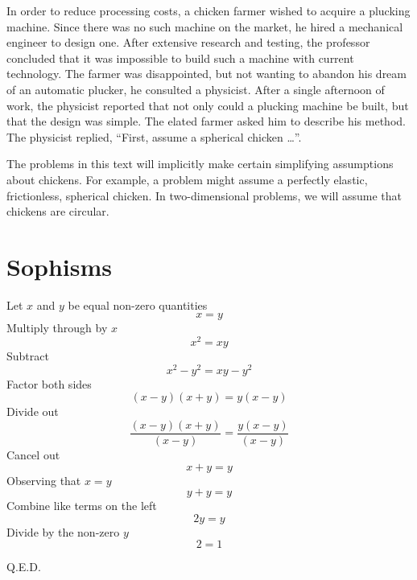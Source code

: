 In order to reduce processing costs, a chicken farmer wished to acquire
a plucking machine.  Since there was no such machine on the market, 
he hired a mechanical engineer to design one.  After extensive
research and testing, the professor concluded that it was impossible to 
build such a machine with current technology.  The farmer was disappointed,
but not wanting to abandon his dream of an automatic plucker, he consulted
a physicist.  After a single afternoon of work, the physicist reported 
that not only could a plucking machine be built, but that the design 
was simple.  The elated farmer asked him to describe his method.
The physicist replied, ``First, assume a spherical chicken \ldots''.

The problems in this text will implicitly make certain simplifying 
assumptions about chickens.  For example, a problem might assume 
a perfectly elastic, frictionless, spherical chicken.  In two-dimensional
problems, we will assume that chickens are circular.



\chapter{Sophisms}
\label{chapter  proofs}
\flushbottom


Let $x$ and $y$ be equal non-zero quantities
\begin{equation*}
x=y
\end{equation*}
Multiply through by $x$
\begin{equation*}
x^2 = x y 
\end{equation*}
 Subtract 
 \begin{equation*}
x^2 - y^2 = x y - y^2 
\end{equation*}
Factor both sides
\begin{equation*}
(x - y)(x + y) = y (x - y) 
\end{equation*}
 Divide out
 \begin{equation*}
\frac{(x - y)(x + y)}{(x - y)} = \frac{y(x - y)}{(x - y)} 
\end{equation*}
 Cancel out 
\begin{equation*}
x + y = y 
\end{equation*}
Observing that  $x=y$
\begin{equation*}
y + y = y 
\end{equation*}
Combine like terms on the left
\begin{equation*}
2 y =y 
\end{equation*}
Divide by the non-zero $y$ 
\begin{equation*}
2=1
\end{equation*}
\begin{flushright}
 Q.E.D.
\end{flushright}

